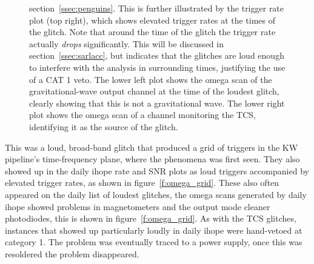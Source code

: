 \begin{figure}
{section~\ref{ssec:penguins}.  This is further illustrated by the trigger
rate plot (top right), which shows elevated trigger rates at the times
of the glitch.  Note that around the time of the glitch the trigger
rate actually {\it drops} significantly.  This will be discussed in
section~\ref{ssec:sarlacc}, but indicates that the glitches are loud
enough to interfere with the analysis in surrounding times, justifying
the use of a CAT 1 veto.  The lower left plot shows the omega scan
of the gravitational-wave output channel at the time of the loudest
glitch, clearly showing that this is not a gravitational wave.  The
lower right plot shows the omega scan of a channel monitoring the TCS,
identifying it as the source of the glitch.}
\end{figure}%



This was a loud, broad-band glitch that produced a grid of triggers in
the KW pipeline's time-frequency plane, where the phenomena was first
seen.  They also showed up in the daily ihope rate and SNR plots as
loud triggers accompanied by elevated trigger rates, as shown in
figure~\ref{f:omega_grid}.  These also often appeared on the
daily list of loudest glitches, the omega scans generated by daily
ihope showed problems in magnetometers and the output mode cleaner
photodiodes, this is shown in figure~\ref{f:omega_grid}.  As with the
TCS glitches, instances that showed up particularly loudly in daily
ihope were hand-vetoed at category 1.  The problem was eventually
traced to a power supply, once this was resoldered the problem
disappeared.



